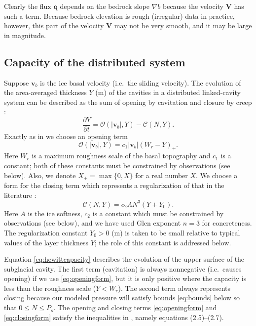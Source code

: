 \documentclass[11pt,final]{amsart}%
\newcommand\bv{\mathbf{v}}
\newcommand\bV{\mathbf{V}}
\newcommand\bq{\mathbf{q}}
\newcommand{\grad}{\nabla}
\begin{document}
Clearly the flux $\bq$ depends on the bedrock slope $\grad b$ because the velocity $\bV$ has such a term.  Because bedrock elevation is rough (irregular) data in practice, however, this part of the velocity $\bV$ may not be very smooth, and it may be large in magnitude.


\subsection*{Capacity of the distributed system}  Suppose $\bv_b$ is the ice basal velocity (i.e.~the sliding velocity).  The evolution of the area-averaged thickness $Y$ (m) of the cavities in a distributed linked-cavity system \citep{Schoofetal2012} can be described as the sum of opening by cavitation and closure by creep \citep{Hewitt2011}:
\begin{equation}
\frac{\partial Y}{\partial t} = \mathcal{O}(|\bv_b|,Y) - \mathcal{C}(N,Y). \label{eq:hewittcapacity}
\end{equation}
Exactly as in \cite{Schoofetal2012} we choose an opening term
\begin{equation}
 \mathcal{O}(|\bv_b|,Y) = c_1 |\bv_b| (W_r - Y)_+. \label{eq:openingform}
\end{equation}
Here $W_r$ is a maximum roughness scale of the basal topography and $c_1$ is a constant; both of these constants must be constrained by observations (see below).  Also, we denote $X_+= \max\{0,X\}$ for a real number $X$.  We choose a form for the closing term which represents a regularization of that in the literature \citep{Hewitt2011,Schoofmeltsupply,Schoofetal2012}:
\begin{equation}
\mathcal{C}(N,Y) = c_2 A N^3 (Y+Y_0). \label{eq:closingform}
\end{equation}
Here $A$ is the ice softness, $c_2$ is a constant which must be constrained by observations (see below), and we have used Glen exponent $n=3$ for concreteness.  The regularization constant $Y_0>0$ (m) is taken to be small relative to typical values of the layer thickness $Y$; the role of this constant is addressed below.

Equation \eqref{eq:hewittcapacity} describes the evolution of the upper surface of the subglacial cavity.  The first term (cavitation) is always nonnegative (i.e.~causes opening) if we use \eqref{eq:openingform}, but it is only positive where the capacity is less than the roughness scale ($Y<W_r$).  The second term always represents closing because our modeled pressure will satisfy bounds \eqref{eq:bounds} below so that $0\le N \le P_o$.  The opening and closing terms \eqref{eq:openingform} and \eqref{eq:closingform} satisfy the inequalities in \cite{Schoofetal2012}, namely equations (2.5)--(2.7).
\end{document}
